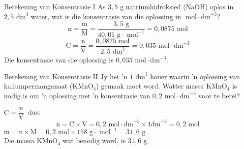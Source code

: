       \noindent
      \begin{wex}{Berekening van Konsentrasie I}
{
      \label{m38712*probfhsst!!!underscore!!!id1654}
      \label{m38712*id283003}As $3,5\text{ g}$ natriumhidroksied ($\text{NaOH}$) oplos in $2,5 {\text{ dm}}^{3}$ water, wat is die konsentrasie van die oplossing in $\text{ mol}\ensuremath{\cdot}{\text{dm}}^{-3}$? }
{
      \label{m38712*id283067}\nopagebreak\noindent{}
    \begin{equation*}
    \text{n}=\frac{\text{m}}{\text{M}}=\frac{3,5 \text{ g}}{40,01 \text{ g} \cdot \text{ mol}^{-1}} = 0,0875 \text{ mol}
      \end{equation*}
\begin{equation*}
\text{C}=\frac{\text{n}}{\text{V}}=\frac{0,0875 \text{ mol}}{2,5 \text{ dm}^{3} }=0,035 \text{ mol} \cdot \text{dm}^{-3}
\end{equation*}
Die konsentrasie van die oplossing is $0,035 \text{ mol} \cdot {\text{dm}}^{-3}$.
}
    \end{wex}

    \noindent
\par


      \begin{wex}{Berekening van Konsentrasie II }
{
Jy het 'n $1 {\text{ dm}}^{3}$ houer waarin 'n oplossing van kaliumpermanganaat ($\text{KMnO}{}_{4}$) gemaak moet word. Watter massa $\text{KMnO}{}_{4}$ is nodig is om 'n oplossing met 'n konsentrasie van $0,2 \text{ mol}\cdot \text{dm}^{-3}$ voor te berei? 
     }
{
$\text{C}=\dfrac{\text{n}}{\text{V}}~$ dus:
      \label{m38712*id283321}\nopagebreak\noindent{}        
    \begin{equation*}
    \text{n}=\text{C}\ensuremath{\times}\text{V}=0,2 \text{ mol} \cdot \text{dm}^{-3} \times 1 \text{dm}^{-3} = 0,2 \text{ mol}
      \end{equation*}
$\text{m}=\text{n} \times \text{M} = 0,2 \text{ mol} \times 158 \text{ g} \cdot \text{ mol}^{-1} = 31,6 \text{ g}$\\
Die massa $\text{KMnO}{}_{4}$ wat benodig word, is $31,6 \text{ g}$.
 
}
    \end{wex}
    \noindent
\label{m38712*secfhsst!!!underscore!!!id1795} 

